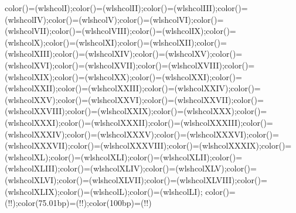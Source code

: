 {{                    color(\xI)=(wlshcolI);color(\xII)=(wlshcolII);color(\xIII)=(wlshcolIII);color(\xIV)=(wlshcolIV);color(\xV)=(wlshcolV);color(\xVI)=(wlshcolVI);color(\xVII)=(wlshcolVII);color(\xVIII)=(wlshcolVIII);color(\xIX)=(wlshcolIX);color(\xX)=(wlshcolX);color(\xXI)=(wlshcolXI);color(\xXII)=(wlshcolXII);color(\xXIII)=(wlshcolXIII);color(\xXIV)=(wlshcolXIV);color(\xXV)=(wlshcolXV);color(\xXVI)=(wlshcolXVI);color(\xXVII)=(wlshcolXVII);color(\xXVIII)=(wlshcolXVIII);color(\xXIX)=(wlshcolXIX);color(\xXX)=(wlshcolXX);color(\xXXI)=(wlshcolXXI);color(\xXXII)=(wlshcolXXII);color(\xXXIII)=(wlshcolXXIII);color(\xXXIV)=(wlshcolXXIV);color(\xXXV)=(wlshcolXXV);color(\xXXVI)=(wlshcolXXVI);color(\xXXVII)=(wlshcolXXVII);color(\xXXVIII)=(wlshcolXXVIII);color(\xXXIX)=(wlshcolXXIX);color(\xXXX)=(wlshcolXXX);color(\xXXXI)=(wlshcolXXXI);color(\xXXXII)=(wlshcolXXXII);color(\xXXXIII)=(wlshcolXXXIII);color(\xXXXIV)=(wlshcolXXXIV);color(\xXXXV)=(wlshcolXXXV);color(\xXXXVI)=(wlshcolXXXVI);color(\xXXXVII)=(wlshcolXXXVII);color(\xXXXVIII)=(wlshcolXXXVIII);color(\xXXXIX)=(wlshcolXXXIX);color(\xXL)=(wlshcolXL);color(\xXLI)=(wlshcolXLI);color(\xXLII)=(wlshcolXLII);color(\xXLIII)=(wlshcolXLIII);color(\xXLIV)=(wlshcolXLIV);color(\xXLV)=(wlshcolXLV);color(\xXLVI)=(wlshcolXLVI);color(\xXLVII)=(wlshcolXLVII);color(\xXLVIII)=(wlshcolXLVIII);color(\xXLIX)=(wlshcolXLIX);color(\xL)=(wlshcolL);color(\xLI)=(wlshcolLI);%
                    color(\pgfspectra@X@IR)=(\pgfspectra@IRcolor!\@pgfspectra@shade@opacity!\pgfspectra@shade@opacitycolor);color(75.01bp)=(\pgfspectra@IRcolor!\@pgfspectra@shade@opacity!\pgfspectra@shade@opacitycolor);color(100bp)=(\pgfspectra@IRcolor!\@pgfspectra@shade@opacity!\pgfspectra@shade@opacitycolor)}%
                \else%
                    \pgfmathprintnumberto{\pgfmathresult}{\pgfspectra@shade@logscale@factor}%
                    \ifnum{}\relax%
                        \pgfmathprintnumberto{\pgfmathresult}{\pgfspectra@X@tmp}%
                        \edef\pgfspectra@X@IR{\pgfspectra@X@tmp bp}%
                    \else%
                        \pgfmathprintnumberto{\pgfmathresult}{\pgfspectra@X@tmp}%
                        \edef\pgfspectra@X@IR{\pgfspectra@X@tmp bp}%
                    \fi%
}
